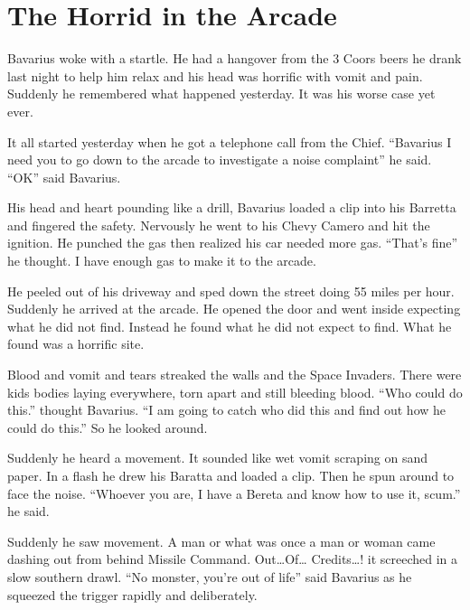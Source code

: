 \chapter{The Horrid in the Arcade}



Bavarius woke with a startle. He had a hangover from the 3 Coors
beers he drank last night to help him relax and his head was
horrific with vomit and pain. Suddenly he remembered what happened
yesterday. It was his worse case yet ever.



It all started yesterday when he got a telephone call from the
Chief. ``Bavarius I need you to go down to the arcade to investigate
a noise complaint'' he said. ``OK'' said Bavarius.



His head and heart pounding like a drill, Bavarius loaded a clip
into his Barretta and fingered the safety. Nervously he went to his
Chevy Camero and hit the ignition. He punched the gas then realized
his car needed more gas. ``That's fine'' he thought. I have enough
gas to make it to the arcade.



He peeled out of his driveway and sped down the street doing 55
miles per hour. Suddenly he arrived at the arcade. He opened the
door and went inside expecting what he did not find. Instead he
found what he did not expect to find. What he found was a horrific
site.



Blood and vomit and tears streaked the walls and the Space
Invaders. There were kids bodies laying everywhere, torn apart and
still bleeding blood. ``Who could do this.'' thought Bavarius. ``I am
going to catch who did this and find out how he could do this.'' So
he looked around.



Suddenly he heard a movement. It sounded like wet vomit scraping on
sand paper. In a flash he drew his Baratta and loaded a clip. Then
he spun around to face the noise. ``Whoever you are, I have a Bereta
and know how to use it, scum.'' he said.



Suddenly he saw movement. A man or what was once a man or woman
came dashing out from behind Missile Command. {\sc Out\ldots Of\ldots
Credits\ldots{}!} it screeched in a slow southern drawl. ``No monster,
you're out of life'' said Bavarius as he squeezed the trigger
rapidly and deliberately.




